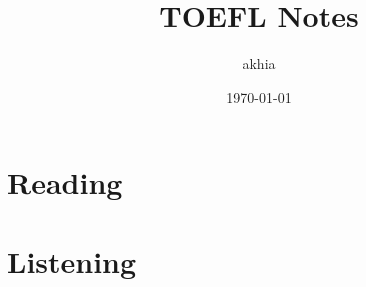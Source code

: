 \documentclass{report}
\title{TOEFL Notes}
\author{akhia}
\date{\today}
\begin{document}
\chapter{Reading}

















































\chapter{Listening}




















\end{document}
